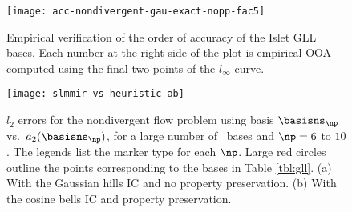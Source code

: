 \begin{figure}[tbh]
  \centering
  \texttt{[image: acc-nondivergent-gau-exact-nopp-fac5]}
  \caption{
    Empirical verification of the order of accuracy of the Islet GLL bases.
    Each number at the right side of the plot is empirical OOA computed using the final two points of the $l_\infty$ curve.
  }
  \label{fig:islet-empirical-ooa}
\end{figure}

\begin{figure}[tb]
  \centering
  \texttt{[image: slmmir-vs-heuristic-ab]}
  \caption{$l_2$ errors for the nondivergent flow problem
    using basis $\basisns_{\np}$ vs.~$a_2(\basisns_{\np})$,
    for a large number of \abtps~bases and $\np=6$ to $10$.
    The legends list the marker type for each $\np$.
    Large red circles outline the points corresponding to the bases in Table \ref{tbl:gll}.
    (a) With the Gaussian hills IC and no property preservation.
    (b) With the cosine bells IC and property preservation.}
  \label{fig:slmmir-vs-heuristic}
\end{figure}

